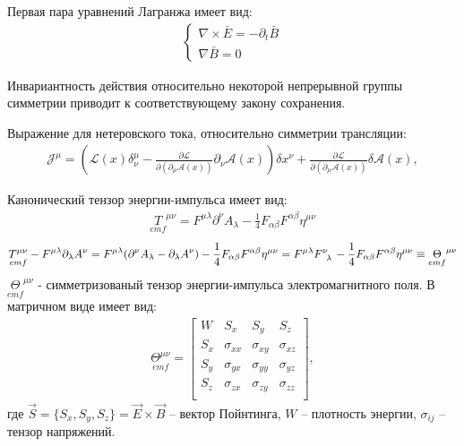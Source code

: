 \documentclass[__main__.tex]{subfiles}
\begin{document}
Первая пара уравнений Лагранжа имеет вид:
\begin{gather}
\begin{cases}
\nabla\times\bar{E}=-\partial_t\bar{B} \\
\nabla\bar{B}=0
\end{cases}
\end{gather}

\begin{theorem}[Нётер]
	Инвариантность действия относительно некоторой непрерывной группы симметрии приводит к соответствующему закону сохранения.
\end{theorem}

Выражение для нетеровского тока, относительно симметрии трансляции:
\begin{gather}
\mathcal{J}^\mu=\left(\mathcal{L}(x)\delta_\nu^\mu-\frac{\partial \mathcal{L}}{\partial (\partial_\mu\mathcal{A}(x))}\partial_\nu\mathcal{A}(x)\right)\delta x^\nu+\frac{\partial\mathcal{L}}{\partial(\partial_\mu\mathcal{A}(x))}\delta\mathcal{A}(x),
\end{gather}

Канонический тензор энергии-импульса имеет вид:
\begin{gather*}
\underset{emf}{T}^{\mu\nu} = F^{\mu\lambda}\partial^\nu A_\lambda - \frac{1}{4}F_{\alpha\beta}F^{\alpha\beta}\eta^{\mu\nu}
\end{gather*}
\begin{gather*}
\underset{emf}{T^{\mu\nu}}
-
F^{\mu\lambda}\partial_\lambda A^\nu
=
F^{\mu\lambda}(\partial^\nu A_\lambda
-
\partial_\lambda A^\nu)
-
\frac{1}{4}F_{\alpha\beta}F^{\alpha\beta}\eta^{\mu\nu}
=
F^{\mu\lambda}F\indices{^\nu_\lambda}
-
\frac{1}{4}F_{\alpha\beta}F^{\alpha\beta}\eta^{\mu\nu}
\equiv
\underset{emf}{\Theta}^{\mu\nu}
\end{gather*}
$\underset{emf}{\Theta}^{\mu\nu}$ - симметризованый тензор энергии-импульса электромагнитного поля. В матричном виде имеет вид:
\begin{gather*}
\underset{emf}{\Theta^{\mu\nu}} =
\left[
\begin{array}{cccc}
W   & S_x         & S_y         & S_z         \\
S_x & \sigma_{xx} & \sigma_{xy} & \sigma_{xz} \\
S_y & \sigma_{yx} & \sigma_{yy} & \sigma_{yz} \\
S_z & \sigma_{zx} & \sigma_{zy} & \sigma_{zz} \\
\end{array}
\right],
\end{gather*}
где $\vec{S}=\{S_x,S_y,S_z\}=\vec{E}\times\vec{B}$ -- вектор Пойнтинга, $W$ -- плотность энергии, $\sigma_{ij}$ -- тензор напряжений.
\end{document}
